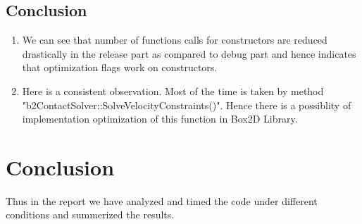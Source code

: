 \documentclass[a4paper,11pt]{article}
\begin{document}
\subsection{Conclusion}
\begin{enumerate}
\item{We can see that number of functions calls for constructors are reduced drastically in the release part as compared to debug part and hence indicates that optimization ﬂags work on constructors.}

\item{Here is a consistent observation. Most of the time is taken by method "b2ContactSolver::SolveVelocityConstraints()". Hence there is a possiblity of implementation optimization of this function in Box2D Library.}
\end{enumerate}

\section{Conclusion}
Thus in the report we have analyzed and timed the code under different conditions and summerized the results.



{}
\end{document}
